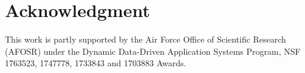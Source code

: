 \section{Acknowledgment}
This work is partly supported by the Air Force Office of Scientific Research (AFOSR) under the Dynamic Data-Driven Application Systems Program, NSF 1763523, 1747778, 1733843 and 1703883 Awards.
